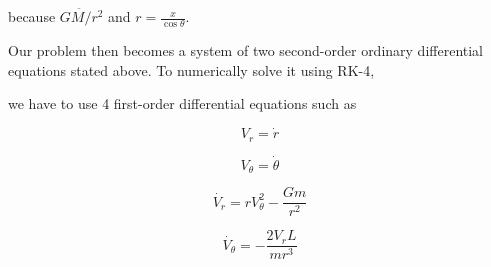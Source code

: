 \documentclass{article}
\begin{document}
because $\ddot{GM/r^2}$ and $r = \frac{x}{\cos{\theta}}$.

Our problem then becomes a system of two second-order ordinary differential equations stated above.
To numerically solve it using RK-4,

we have to use 4 first-order differential equations such as 

\begin{equation}
    V_r = \dot{r}
\end{equation}

\begin{equation}
    V_\theta = \dot{\theta}
\end{equation}

\begin{equation}
    \dot{V_r} = r V_\theta ^2 - \frac{Gm}{r^2}
\end{equation}

\begin{equation}
    \dot{V_\theta} = - \frac{2V_r L}{mr^3} 
\end{equation}
\end{document}
